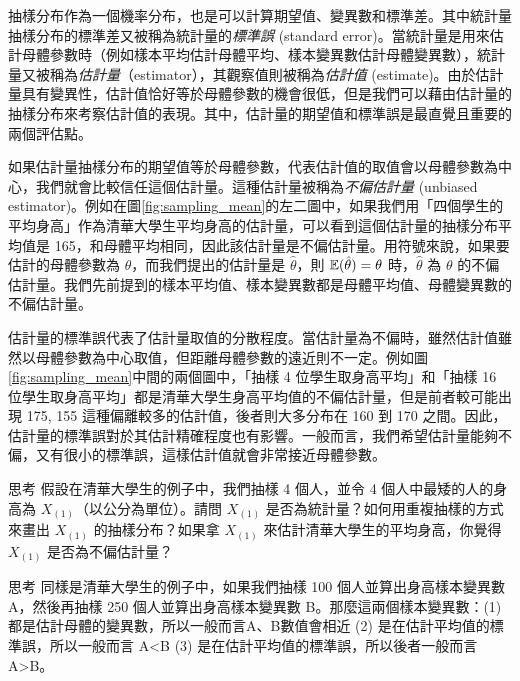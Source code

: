     抽樣分布作為一個機率分布，也是可以計算期望值、變異數和標準差。其中統計量抽樣分布的標準差又被稱為統計量的\textit{標準誤} (standard error)。當統計量是用來估計母體參數時（例如樣本平均估計母體平均、樣本變異數估計母體變異數），統計量又被稱為\textit{估計量}（estimator），其觀察值則被稱為\textit{估計值} (estimate)。由於估計量具有變異性，估計值恰好等於母體參數的機會很低，但是我們可以藉由估計量的抽樣分布來考察估計值的表現。其中，估計量的期望值和標準誤是最直覺且重要的兩個評估點。
    
    如果估計量抽樣分布的期望值等於母體參數，代表估計值的取值會以母體參數為中心，我們就會比較信任這個估計量。這種估計量被稱為\textit{不偏估計量} (unbiased estimator)。例如在圖\ref{fig:sampling_mean}的左二圖中，如果我們用「四個學生的平均身高」作為清華大學生平均身高的估計量，可以看到這個估計量的抽樣分布平均值是 165，和母體平均相同，因此該估計量是不偏估計量。用符號來說，如果要估計的母體參數為 $\theta$，而我們提出的估計量是 $\hat{\theta}$，則 $\mathbb{E}(\hat{\theta}) = \theta$ 時，$\hat{\theta}$ 為 $\theta$ 的不偏估計量。我們先前提到的樣本平均值、樣本變異數都是母體平均值、母體變異數的不偏估計量。

    估計量的標準誤代表了估計量取值的分散程度。當估計量為不偏時，雖然估計值雖然以母體參數為中心取值，但距離母體參數的遠近則不一定。例如圖\ref{fig:sampling_mean}中間的兩個圖中，「抽樣 4 位學生取身高平均」和「抽樣 16 位學生取身高平均」都是清華大學生身高平均值的不偏估計量，但是前者較可能出現 175, 155 這種偏離較多的估計值，後者則大多分布在 160 到 170 之間。因此，估計量的標準誤對於其估計精確程度也有影響。一般而言，我們希望估計量能夠不偏，又有很小的標準誤，這樣估計值就會非常接近母體參數。

    \bigskip
    
    \begin{custom}{思考}
        假設在清華大學生的例子中，我們抽樣 4 個人，並令 4 個人中最矮的人的身高為 $X_{(1)}$（以公分為單位）。請問 $X_{(1)}$ 是否為統計量？如何用重複抽樣的方式來畫出 $X_{(1)}$ 的抽樣分布？如果拿 $X_{(1)}$ 來估計清華大學生的平均身高，你覺得 $X_{(1)}$ 是否為不偏估計量？
    \end{custom}

    \bigskip

    \begin{custom}{思考}
        同樣是清華大學生的例子中，如果我們抽樣 100 個人並算出身高樣本變異數 A，然後再抽樣 250 個人並算出身高樣本變異數 B。那麼這兩個樣本變異數：(1) 都是估計母體的變異數，所以一般而言A、B數值會相近 (2) 是在估計平均值的標準誤，所以一般而言 A<B (3) 是在估計平均值的標準誤，所以後者一般而言 A>B。
    \end{custom}

